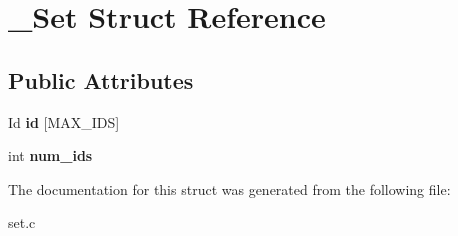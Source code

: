 \hypertarget{struct__Set}{}\section{\+\_\+\+Set Struct Reference}
\label{struct__Set}
\subsection*{Public Attributes}
\begin{DoxyCompactItemize}
\item 
\mbox{\label{struct__Set_a2f96cef7e83d5a8496d9ef1f0f03894a}} 
Id {\bfseries id} \mbox{[}M\+A\+X\+\_\+\+I\+DS\mbox{]}
\item 
\mbox{\label{struct__Set_a0165e806ff2b4de3ec7dd0991a54a677}} 
int {\bfseries num\+\_\+ids}
\end{DoxyCompactItemize}


The documentation for this struct was generated from the following file\+:\begin{DoxyCompactItemize}
\item 
set.\+c\end{DoxyCompactItemize}
